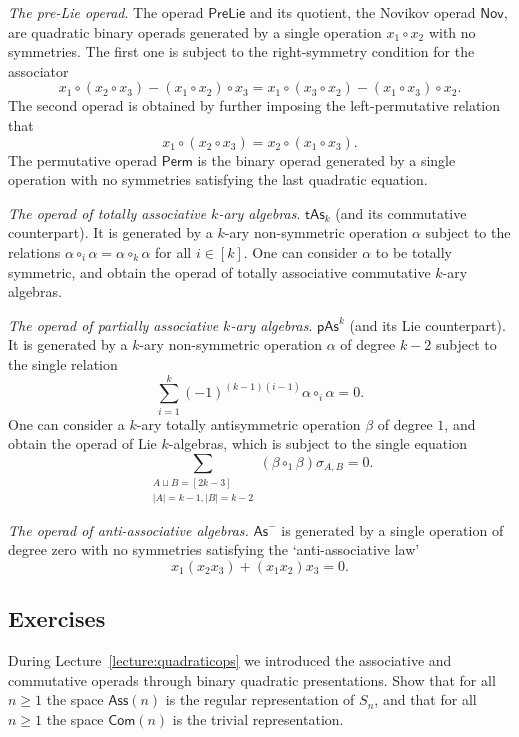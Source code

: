 \smallskip

\emph{The pre-Lie operad}. The operad $\mathsf{PreLie}$ and its
quotient, the Novikov operad $\mathsf{Nov}$, are quadratic
binary operads generated by a single operation $x_1\circ x_2$
with no symmetries. The first one is subject to the right-symmetry
condition for the associator
\[ 
x_1\circ (x_2\circ x_3) - (x_1\circ x_2)\circ x_3	=
x_1\circ (x_3\circ x_2) - (x_1\circ x_3)\circ x_2.
\]
The second 
operad is obtained by further imposing the left-permutative
relation that 
\[ x_1\circ (x_2\circ x_3) = x_2\circ (x_1\circ x_3).\]
The permutative operad $\mathsf{Perm}$ is the binary
operad generated by a single operation with no symmetries
satisfying the last quadratic equation.

\smallskip

\emph{The operad of totally associative $k$-ary algebras}. 
$\mathsf{tAs}_k$ (and its commutative counterpart). It is generated
by a $k$-ary non-symmetric operation $\alpha$ subject to
the relations $\alpha \circ_i \alpha =\alpha\circ_k \alpha$
for all $i\in [k]$. One can consider $\alpha$ to be
totally symmetric, and obtain the operad of totally
associative commutative $k$-ary algebras.

\smallskip

\emph{The operad of partially associative $k$-ary algebras}.
$\mathsf{pAs}^k$ (and its Lie counterpart). It is generated
by a $k$-ary non-symmetric operation $\alpha$ of degree $k-2$
subject to the single relation
\[ 
	\sum_{i=1}^k (-1)^{(k-1)(i-1)} \alpha\circ_i \alpha = 0.\]
One can consider a $k$-ary totally antisymmetric operation
$\beta$ of degree $1$, and obtain the operad of Lie $k$-algebras, 
which is subject to the single equation
\[
 \sum_{\substack{A\sqcup B = [2k-3] \\
 |A|=k-1,|B|=k-2}}  (\beta\circ_1\beta)\sigma_{A,B} = 0.
 \]

\smallskip

\emph{The operad of anti-associative algebras.} $\mathsf{As}^-$ is
generated by a single operation of degree zero with no symmetries
satisfying the `anti-associative law'
\[ x_1(x_2x_3) + (x_1x_2)x_3 = 0. \]

\subsection{Exercises}


 \begin{question}
During Lecture~\ref{lecture:quadraticops} we introduced the associative and commutative operads
through binary quadratic presentations. Show  that 
for all $n\geqslant 1$ the space $\mathsf{Ass}(n)$ is the
regular representation of $S_n$, and that for 
all $n\geqslant 1$ the space $\mathsf{Com}(n)$ is the 
trivial representation.
\end{question}

